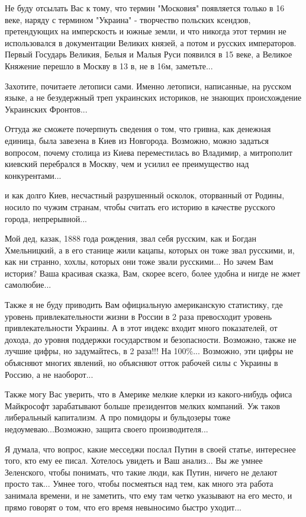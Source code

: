 \begin{itemize}
Не буду отсылать Вас к тому, что термин "Московия" появляется только в 16 веке,
наряду с термином "Украина" - творчество польских ксендзов, претендующих на
имперскость и южные земли, и что никогда этот термин не использовался в
документации Великих князей, а потом и русских императоров. Первый Государь
Великия, Белыя и Малыя Руси появился в 15 веке, а Великое Княжение перешло в
Москву в 13 в, не в 16м, заметьте...

Захотите, почитаете летописи сами. Именно летописи, написанные, на
русском языке, а не безудержный треп украинских историков, не знающих
происхождение Украинских Фронтов...

Оттуда же сможете почерпнуть сведения о том, что гривна, как денежная единица,
была завезена в Киев из Новгорода. Возможно, можно задаться вопросом, почему
столица из Киева переместилась во Владимир, а митрополит киевский перебрался в
Москву, чем и усилил ее преимущество над конкурентами... 

и как долго Киев, несчастный разрушенный осколок, оторванный от Родины, носило
по чужим странам, чтобы считать его историю в качестве русского города,
непрерывной...

Мой дед, казак, 1888 года рождения, звал себя русским, как и Богдан
Хмельницкий, а в его станице жили кацапы, которых он тоже звал русскими, и, как
ни странно, хохлы, которых они тоже звали русскими... Но зачем Вам история?
Ваша красивая сказка, Вам, скорее всего, более удобна и нигде не жмет
самолюбие...

Также я не буду приводить Вам официальную американскую статистику, где уровень
привлекательности жизни в России в 2 раза превосходит уровень привлекательности
Украины. А в этот индекс входит много показателей, от дохода, до уровня
поддержки государством и безопасности. Возможно, также не лучшие цифры, но
задумайтесь, в 2 раза!!! На 100\%... Возможно, эти цифры не объясняют многих
явлений, но объясняют отток рабочей силы с Украины в Россию, а не наоборот...

Также могу Вас уверить, что в Америке мелкие клерки из какого-нибудь офиса
Майкрософт зарабатывают больше президентов мелких компаний. Уж таков
либеральный капитализм. А про помидоры и бульдозеры тоже недоумеваю...Возможно,
защита своего производителя...

Я думала, что вопрос, какие месседжи послал Путин в своей статье, интереснее
того, кто ему ее писал. Хотелось увидеть и Ваш анализ... Вы же умнее
Зеленского, чтобы понимать, что такие люди, как Путин, ничего не делают просто
так... Умнее того, чтобы посмеяться над тем, как много эта работа занимала
времени, и не заметить, что ему там четко указывают на его место, и прямо
говорят о том, что его время невыносимо быстро уходит... 


\end{itemize}
